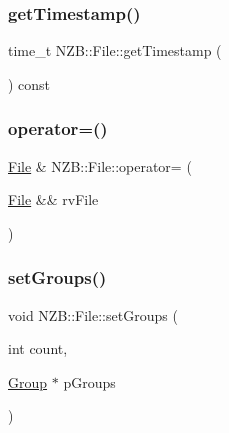 \hypertarget{class_n_z_b_1_1_file_a01adb6cd77a2f9546043aec2d8fef936}{}\label{class_n_z_b_1_1_file_a01adb6cd77a2f9546043aec2d8fef936} 
\subsubsection{\texorpdfstring{get\+Timestamp()}{getTimestamp()}}
{\footnotesize\ttfamily time\+\_\+t N\+Z\+B\+::\+File\+::get\+Timestamp (\begin{DoxyParamCaption}{ }\end{DoxyParamCaption}) const\hspace{0.3cm}{\ttfamily [inline]}}

\hypertarget{class_n_z_b_1_1_file_a29355ed8ab7a8bd97588b8a1ade358de}{}\label{class_n_z_b_1_1_file_a29355ed8ab7a8bd97588b8a1ade358de} 
\subsubsection{\texorpdfstring{operator=()}{operator=()}}
{\footnotesize\ttfamily \hyperlink{class_n_z_b_1_1_file}{File} \& N\+Z\+B\+::\+File\+::operator= (\begin{DoxyParamCaption}\item[{\hyperlink{class_n_z_b_1_1_file}{File} \&\&}]{rv\+File }\end{DoxyParamCaption})}

\hypertarget{class_n_z_b_1_1_file_a3316ed024ea100d7afefcc9f5bcba25f}{}\label{class_n_z_b_1_1_file_a3316ed024ea100d7afefcc9f5bcba25f} 
\subsubsection{\texorpdfstring{set\+Groups()}{setGroups()}}
{\footnotesize\ttfamily void N\+Z\+B\+::\+File\+::set\+Groups (\begin{DoxyParamCaption}\item[{int}]{count,  }\item[{\hyperlink{class_n_z_b_1_1_group}{Group} $\ast$}]{p\+Groups }\end{DoxyParamCaption})}

